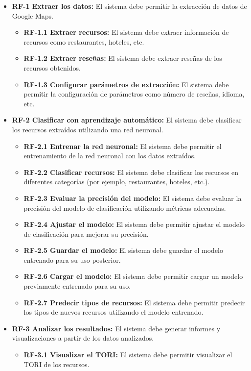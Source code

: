 \begin{itemize}
	\item \textbf{RF-1 Extraer los datos:} El sistema debe permitir la extracción de datos de Google Maps.
		\begin{itemize}
			\item \textbf{RF-1.1 Extraer recursos:} El sistema debe extraer información de recursos como restaurantes, hoteles, etc.
			\item \textbf{RF-1.2 Extraer reseñas:} El sistema debe extraer reseñas de los recursos obtenidos.
			\item \textbf{RF-1.3 Configurar parámetros de extracción:} El sistema debe permitir la configuración de parámetros como número de reseñas, idioma, etc.
		\end{itemize}
	\item \textbf{RF-2 Clasificar con aprendizaje automático:} El sistema debe clasificar los recursos extraídos utilizando una red neuronal.
		\begin{itemize}
			\item \textbf{RF-2.1 Entrenar la red neuronal:} El sistema debe permitir el entrenamiento de la red neuronal con los datos extraídos.
			\item \textbf{RF-2.2 Clasificar recursos:} El sistema debe clasificar los recursos en diferentes categorías (por ejemplo, restaurantes, hoteles, etc.).
			\item \textbf{RF-2.3 Evaluar la precisión del modelo:} El sistema debe evaluar la precisión del modelo de clasificación utilizando métricas adecuadas.
			\item \textbf{RF-2.4 Ajustar el modelo:} El sistema debe permitir ajustar el modelo de clasificación para mejorar su precisión.
			\item \textbf{RF-2.5 Guardar el modelo:} El sistema debe guardar el modelo entrenado para su uso posterior.
			\item \textbf{RF-2.6 Cargar el modelo:} El sistema debe permitir cargar un modelo previamente entrenado para su uso.
			\item \textbf{RF-2.7 Predecir tipos de recursos:} El sistema debe permitir predecir los tipos de nuevos recursos utilizando el modelo entrenado.
		\end{itemize}
	\item \textbf{RF-3 Analizar los resultados:} El sistema debe generar informes y visualizaciones a partir de los datos analizados.
		\begin{itemize}
			\item \textbf{RF-3.1 Visualizar el TORI:} El sistema debe permitir visualizar el TORI de los recursos.

\end{itemize}
\end{itemize}
